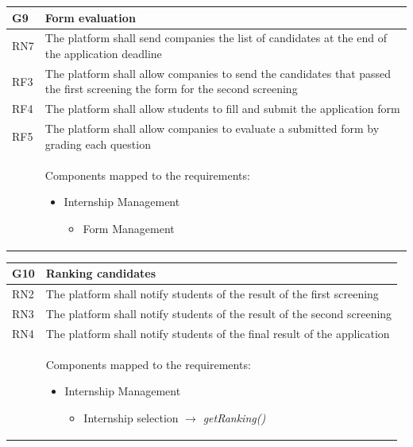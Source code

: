 \documentclass[11pt,twoside]{article}
\begin{document}
\begin{table}[H]
\begin{tabular}{| p{} | p{} |}
\hline
\rowcolor{Gray1}
\textbf{G9} & \textbf{Form evaluation} \\
\hline
\rowcolor{Gray2}
RN7 & The platform shall send companies the list of candidates at the end of the application deadline \\
\hline
\rowcolor{Gray2}
RF3 & The platform shall allow companies to send the candidates that passed the first screening the form for the second screening \\
\hline
\rowcolor{Gray2}
RF4 & The platform shall allow students to fill and submit the application form \\
\hline
\rowcolor{Gray2}
RF5 & The platform shall allow companies to evaluate a submitted form by grading each question \\
\hline
 & Components mapped to the requirements:
\begin{itemize}
\item Internship Management
 	\begin{itemize}
 	\item Form Management
 	\end{itemize}
\end{itemize} \\
\hline
\end{tabular}
\end{table}

\begin{table}[H]
\begin{tabular}{| p{} | p{} |}
\hline
\rowcolor{Gray1}
\textbf{G10} & \textbf{Ranking candidates} \\
\hline
\rowcolor{Gray2}
RN2 & The platform shall notify students of the result of the first screening \\
\hline
\rowcolor{Gray2}
RN3 & The platform shall notify students of the result of the second screening \\
\hline
\rowcolor{Gray2}
RN4 & The platform shall notify students of the final result of the application \\
\hline
 & Components mapped to the requirements:
\begin{itemize}
\item Internship Management
 	\begin{itemize}
 	\item Internship selection $\rightarrow$ \textit{getRanking()}
 	\end{itemize}
\end{itemize} \\
\hline
\end{tabular}
\end{table}
\end{document}
